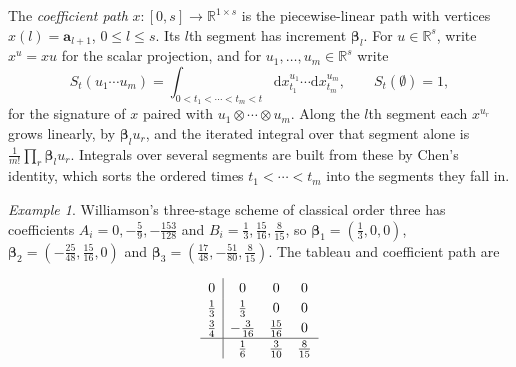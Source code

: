 \documentclass[11pt]{article}
\theoremstyle{remark}
\newtheorem{example}[theorem]{Example}
\newcommand{\bb}{\mathbf b}
\newcommand{\ba}{\mathbf a}
\newcommand{\bbeta}{\boldsymbol\beta}
\begin{document}
The \emph{coefficient path} $x:[0,s]\to\mathbb R^{1\times s}$ is the piecewise-linear path with vertices $x(l)=\ba_{l+1}$, $0\leq l\leq s$. Its $l$th segment has increment $\bbeta_l$. For $u\in\mathbb R^s$, write $x^u=xu$ for the scalar projection, and for $u_1,\ldots,u_m\in\mathbb R^s$ write
\[
S_t(u_1\cdots u_m)=\int_{0<t_1<\cdots<t_m<t}\mathrm dx^{u_1}_{t_1}\cdots\mathrm dx^{u_m}_{t_m},
\qquad S_t(\emptyset)=1,
\]
for the signature of $x$ paired with $u_1\otimes\cdots\otimes u_m$. Along the $l$th segment each $x^{u_r}$ grows linearly, by $\bbeta_lu_r$, and the iterated integral over that segment alone is $\frac1{m!}\prod_r\bbeta_lu_r$. Integrals over several segments are built from these by Chen's identity, which sorts the ordered times $t_1<\cdots<t_m$ into the segments they fall in.

\begin{example}
\label{ex:path-williamson}
Williamson's three-stage scheme of classical order three has coefficients $A_i=0,-\frac59,-\frac{153}{128}$ and $B_i=\frac13,\frac{15}{16},\frac8{15}$, so $\bbeta_1=(\frac13,0,0)$, $\bbeta_2=(-\frac{25}{48},\frac{15}{16},0)$ and $\bbeta_3=(\frac{17}{48},-\frac{51}{80},\frac8{15})$. The tableau and coefficient path are
\begin{center}
\begin{minipage}[c]{0.34\linewidth}
\[
\renewcommand{\arraystretch}{1.2}
\begin{array}{c|ccc}
0&0&0&0\\
\tfrac13&\tfrac13&0&0\\
\tfrac34&-\tfrac3{16}&\tfrac{15}{16}&0\\\hline
&\tfrac16&\tfrac3{10}&\tfrac8{15}
\end{array}
\]
\end{minipage}\hfill
\begin{minipage}[c]{0.64\linewidth}
\centering
{}
\end{minipage}
\end{center}
\end{example}
\end{document}
